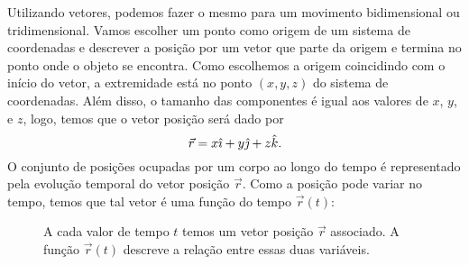 Utilizando vetores, podemos fazer o mesmo para um movimento bidimensional ou tridimensional. Vamos escolher um ponto como origem de um sistema de coordenadas e descrever a posição por um vetor que parte da origem e termina no ponto onde o objeto se encontra. Como escolhemos a origem coincidindo com o início do vetor, a extremidade está no ponto $(x, y, z)$ do sistema de coordenadas. Além disso, o tamanho das componentes é igual aos valores de $x$, $y$, e $z$, logo, temos que o vetor posição será dado por
\begin{equation}
  \vec{r} = x \hat{\imath} + y \hat{\jmath} + z \hat{k}.
\end{equation}
%
O conjunto de posições ocupadas por um corpo ao longo do tempo é representado pela evolução temporal do vetor posição $\vec{r}$. Como a posição pode variar no tempo, temos que tal vetor é uma função do tempo $\vec{r}(t)$:
\begin{figure}
\centering
{}
\caption{A cada valor de tempo $t$ temos um vetor posição $\vec{r}$ associado. A função $\vec{r}(t)$ descreve a relação entre essas duas variáveis.}
\end{figure}

